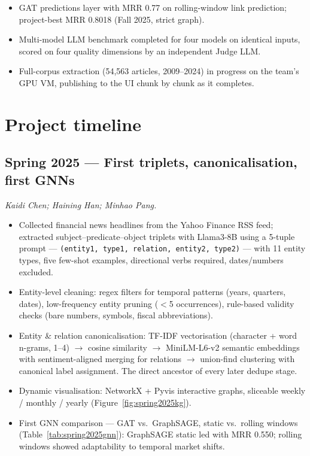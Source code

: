 \documentclass[11pt]{article}
\begin{document}
\begin{itemize}
\begin{itemize}
      \item GAT predictions layer with MRR 0.77 on rolling-window link prediction; project-best MRR 0.8018 (Fall 2025, strict graph).
      \item Multi-model LLM benchmark completed for four models on identical inputs, scored on four quality dimensions by an independent Judge LLM.
      \item Full-corpus extraction (54{,}563 articles, 2009--2024) in progress on the team's GPU VM, publishing to the UI chunk by chunk as it completes.
    \end{itemize}
\end{itemize}

\section{Project timeline}
\label{sec:timeline}

\subsection{Spring 2025 --- First triplets, canonicalisation, first GNNs}
\emph{Kaidi Chen; Haining Han; Minhao Pang.}

\begin{itemize}
  \item Collected financial news headlines from the Yahoo Finance RSS feed; extracted subject--predicate--object triplets with Llama3-8B using a 5-tuple prompt --- \texttt{(entity1, type1, relation, entity2, type2)} --- with 11 entity types, five few-shot examples, directional verbs required, dates/numbers excluded.
  \item Entity-level cleaning: regex filters for temporal patterns (years, quarters, dates), low-frequency entity pruning (\(<\)5 occurrences), rule-based validity checks (bare numbers, symbols, fiscal abbreviations).
  \item Entity \& relation canonicalisation: TF-IDF vectorisation (character + word n-grams, 1--4) \(\to\) cosine similarity \(\to\) MiniLM-L6-v2 semantic embeddings with sentiment-aligned merging for relations \(\to\) union-find clustering with canonical label assignment. The direct ancestor of every later dedupe stage.
  \item Dynamic visualisation: NetworkX + Pyvis interactive graphs, sliceable weekly / monthly / yearly (Figure~\ref{fig:spring2025kg}).
  \item First GNN comparison --- GAT vs.\ GraphSAGE, static vs.\ rolling windows (Table~\ref{tab:spring2025gnn}): GraphSAGE static led with MRR 0.550; rolling windows showed adaptability to temporal market shifts.
\end{itemize}
\end{document}

